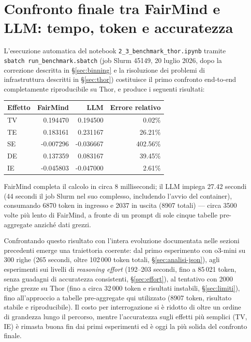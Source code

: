 \section{Confronto finale tra FairMind e LLM: tempo, token e accuratezza}
\label{sec:confronto-finale}

L'esecuzione automatica del notebook \texttt{2\_3\_benchmark\_thor.ipynb} tramite \texttt{sbatch run\_benchmark.sbatch} (job Slurm 45149, 20 luglio 2026, dopo la correzione descritta in \S\ref{sec:binning} e la risoluzione dei problemi di infrastruttura descritti in \S\ref{sec:thor}) costituisce il primo confronto end-to-end completamente riproducibile su Thor, e produce i seguenti risultati:

\begin{center}
\begin{tabular}{lrrr}
\toprule
Effetto & FairMind & LLM & Errore relativo \\
\midrule
TV & 0.194470 & 0.194500 & 0.02\% \\
TE & 0.183161 & 0.231167 & 26.21\% \\
SE & -0.007296 & -0.036667 & 402.56\% \\
DE & 0.137359 & 0.083167 & 39.45\% \\
IE & -0.045803 & -0.047000 & 2.61\% \\
\bottomrule
\end{tabular}
\end{center}

FairMind completa il calcolo in circa 8 millisecondi; il LLM impiega 27.42 secondi (44 secondi il job Slurm nel suo complesso, includendo l'avvio del container), consumando 6870 token in ingresso e 2037 in uscita (8907 totali) --- circa 3500 volte più lento di FairMind, a fronte di un prompt di sole cinque tabelle pre-aggregate anziché dati grezzi.

Confrontando questo risultato con l'intera evoluzione documentata nelle sezioni precedenti emerge una traiettoria coerente: dal primo esperimento con o3-mini su 300 righe (265 secondi, oltre 102\,000 token totali, \S\ref{sec:analisi-json}), agli esperimenti sui livelli di \emph{reasoning effort} (192--203 secondi, fino a 85\,021 token, senza guadagni di accuratezza consistenti, \S\ref{sec:effort}), al tentativo con 2000 righe grezze su Thor (fino a circa 32\,000 token e risultati instabili, \S\ref{sec:limiti}), fino all'approccio a tabelle pre-aggregate qui utilizzato (8907 token, risultato stabile e riproducibile). Il costo per interrogazione si è ridotto di oltre un ordine di grandezza lungo il percorso, mentre l'accuratezza sugli effetti più semplici (TV, IE) è rimasta buona fin dai primi esperimenti ed è oggi la più solida del confronto finale.

